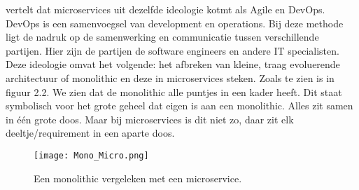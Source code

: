 \textcite{Benetis2016a} vertelt dat microservices uit dezelfde ideologie kotmt als Agile en DevOps. DevOps is een samenvoegsel van development en operations. Bij deze methode ligt de nadruk op de samenwerking en communicatie tussen verschillende partijen. Hier zijn de partijen de software engineers en andere IT specialisten. Deze ideologie omvat het volgende: het afbreken van kleine, traag evoluerende architectuur of monolithic en deze in microservices steken. Zoals te zien is in figuur 2.2. We zien dat de monolithic alle puntjes in een kader heeft. Dit staat symbolisch voor het grote geheel dat eigen is aan een monolithic. Alles zit samen in één grote doos. Maar bij microservices is dit niet zo, daar zit elk deeltje/requirement in een aparte doos. 
\begin{figure}[h]
	\texttt{[image: Mono\_Micro.png]}
	\centering
	\caption{Een monolithic vergeleken met een microservice. \textcite{Benetis2016a}}
\end{figure}


